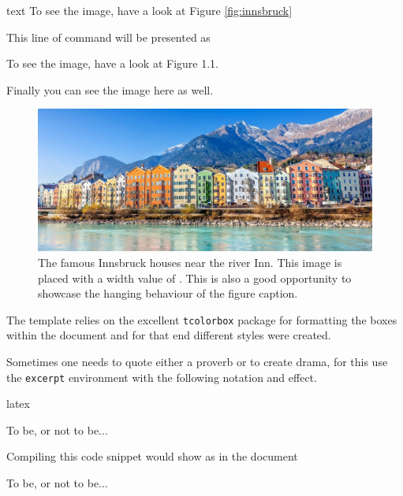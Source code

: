 \documentclass[minted, draw]{../tex/hebdomon}
\begin{document}
%
\begin{code}{text}
To see the image, have a look at Figure \ref{fig:innsbruck}
\end{code}
%
This line of command will be presented as
%
\begin{excerpt}
	To see the image, have a look at Figure 1.1.
\end{excerpt}
%
Finally you can see the image here as well.
%
\begin{figure}[ht]
	\centering
	\includegraphics[width=\linewidth]{figures/innsbruck.jpg}
	\caption{The famous Innsbruck houses near the river Inn. This image is
		placed with a width value of . This is also
		a good opportunity to showcase the hanging behaviour of the figure
		caption.}
\end{figure}
%
%
\begin{hgitemize}
	\item[\pcode{excerpt}] The template relies on the excellent \lstinline[columns=fixed]{tcolorbox}
	package for formatting the boxes within the document and for that end different styles were created.
	\item[] Sometimes one needs to quote either a proverb or to create drama, for this use
	the \lstinline[columns=fixed]{excerpt} environment with the following notation and effect.
\end{hgitemize}
%
\begin{code}{latex}
\begin{excerpt}
  To be, or not to be...
\end{excerpt}
\end{code}
%
\begin{hgitemize}
	\item[] Compiling this code snippet would show as in the document
\end{hgitemize}
%
\begin{excerpt}
	To be, or not to be...
\end{excerpt}
\end{document}
